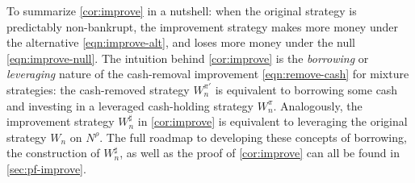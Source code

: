 




To summarize \cref{cor:improve} in a nutshell: when the original strategy is predictably non-bankrupt, the improvement strategy makes more money under the alternative \eqref{eqn:improve-alt}, and loses more money under the null \eqref{eqn:improve-null}.
The intuition behind \cref{cor:improve} is the \emph{borrowing} or \emph{leveraging} 
nature of the cash-removal improvement \eqref{eqn:remove-cash} for mixture strategies: the cash-removed strategy $W_n^{\pi '}$ is equivalent to borrowing some cash and investing in a leveraged cash-holding strategy $W_n^\pi$. Analogously, the improvement strategy $W_n^{\sharp}$ in \cref{cor:improve} is equivalent to leveraging the original strategy $W_n$ on $N^\rho$. The full roadmap to developing these concepts of borrowing, the construction of $W_n^\sharp$, as well as the proof of \cref{cor:improve} can all be found in \cref{sec:pf-improve}.


